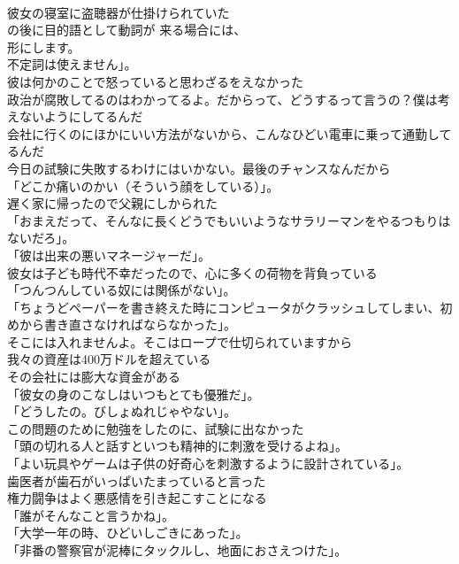 \documentclass[8pt]{extreport}
\begin{document}
\begin{CJK}{UTF8}{min}
\\	彼女の寝室に盗聴器が仕掛けられていた	
\\	の後に目的語として動詞が 来る場合には、
\\	形にします。
\\	不定詞は使えません」。	
\\	彼は何かのことで怒っていると思わざるをえなかった	
\\	政治が腐敗してるのはわかってるよ。だからって、どうするって言うの？僕は考えないようにしてるんだ	
\\	会社に行くのにほかにいい方法がないから、こんなひどい電車に乗って通勤してるんだ	
\\	今日の試験に失敗するわけにはいかない。最後のチャンスなんだから	
\\	「どこか痛いのかい（そういう顔をしている）」。	
\\	遅く家に帰ったので父親にしかられた	
\\	「おまえだって、そんなに長くどうでもいいようなサラリーマンをやるつもりはないだろ」。	
\\	「彼は出来の悪いマネージャーだ」。	
\\	彼女は子ども時代不幸だったので、心に多くの荷物を背負っている	
\\	「つんつんしている奴には関係がない」。	
\\	「ちょうどペーパーを書き終えた時にコンピュータがクラッシュしてしまい、初めから書き直さなければならなかった」。	
\\	そこには入れませんよ。そこはロープで仕切られていますから	
\\	我々の資産は400万ドルを超えている	
\\	その会社には膨大な資金がある	
\\	「彼女の身のこなしはいつもとても優雅だ」。	
\\	「どうしたの。びしょぬれじゃやない」。	
\\	この問題のために勉強をしたのに、試験に出なかった	
\\	「頭の切れる人と話すといつも精神的に刺激を受けるよね」。	
\\	「よい玩具やゲームは子供の好奇心を刺激するように設計されている」。	
\\	歯医者が歯石がいっぱいたまっていると言った	
\\	権力闘争はよく悪感情を引き起こすことになる	
\\	「誰がそんなこと言うかね」。	
\\	「大学一年の時、ひどいしごきにあった」。	
\\	「非番の警察官が泥棒にタックルし、地面におさえつけた」。	

\end{CJK}
\end{document}
